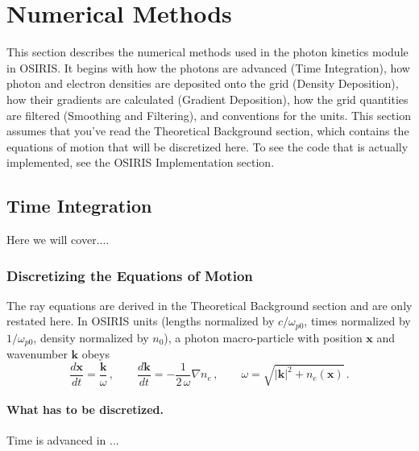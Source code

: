 \newpage
\section{Numerical Methods}

This section describes the numerical methods used in the photon kinetics
module in OSIRIS. It begins with how the photons are advanced (Time Integration),
how photon and electron densities are deposited onto the grid (Density
Deposition), how their gradients are calculated (Gradient Deposition), how
the grid quantities are filtered (Smoothing and Filtering), and conventions
for the units. This section assumes that you've read the Theoretical Background 
section, which contains the equations of motion that will be discretized here.
To see the  code that is actually implemented, see the OSIRIS Implementation 
section.

\subsection{Time Integration}

Here we will cover....

\subsubsection{Discretizing the Equations of Motion}

The ray equations are derived in the Theoretical Background section and are only
restated here. In OSIRIS units (lengths normalized by $c/\omega_{p0}$, times
normalized by $1/\omega_{p0}$, density normalized by $n_0$), a photon 
macro-particle with position $\mathbf{x}$ and wavenumber $\mathbf{k}$ obeys
\begin{equation*}
    \frac{d\mathbf{x}}{dt} = \frac{\mathbf{k}}{\omega}\,,
    \qquad
    \frac{d\mathbf{k}}{dt} = -\frac{1}{2\,\omega}\nabla n_e\,,
    \qquad
    \omega = \sqrt{|\mathbf{k}|^{2} + n_e(\mathbf{x})}\,.
    \label{eq:ray_equations}
\end{equation*}

\paragraph{What has to be discretized.}
Time is advanced in  ...

